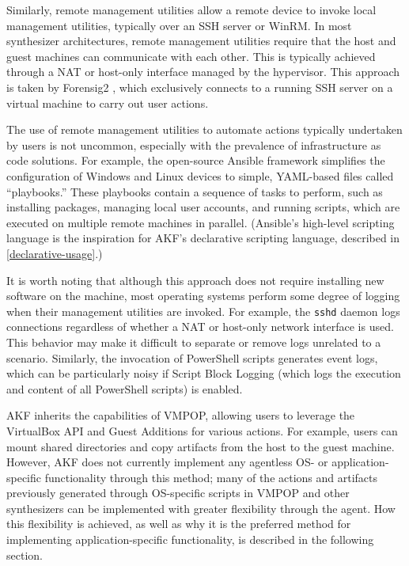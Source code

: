 \documentclass[letterpaper,12pt]{report}
\newcommand{\passthrough}[1]{#1}
\begin{document}
Similarly, remote management utilities allow a remote device to invoke
local management utilities, typically over an SSH server or WinRM. In
most synthesizer architectures, remote management utilities require that
the host and guest machines can communicate with each other. This is
typically achieved through a NAT or host-only interface managed by the
hypervisor. This approach is taken by Forensig2
\cite{mochForensicImageGenerator2009}, which exclusively connects to
a running SSH server on a virtual machine to carry out user actions.

The use of remote management utilities to automate actions typically
undertaken by users is not uncommon, especially with the prevalence of
infrastructure as code solutions. For example, the open-source Ansible
framework simplifies the configuration of Windows and Linux devices to
simple, YAML-based files called ``playbooks.'' These playbooks contain a
sequence of tasks to perform, such as installing packages, managing
local user accounts, and running scripts, which are executed on multiple
remote machines in parallel. (Ansible's high-level scripting language is
the inspiration for AKF's declarative scripting language, described in
\autoref{declarative-usage}.)

It is worth noting that although this approach does not require
installing new software on the machine, most operating systems perform
some degree of logging when their management utilities are invoked. For
example, the \passthrough{\lstinline!sshd!} daemon logs connections
regardless of whether a NAT or host-only network interface is used. This
behavior may make it difficult to separate or remove logs unrelated to a
scenario. Similarly, the invocation of PowerShell scripts generates
event logs, which can be particularly noisy if Script Block Logging
(which logs the execution and content of all PowerShell scripts) is
enabled.

AKF inherits the capabilities of VMPOP, allowing users to leverage the
VirtualBox API and Guest Additions for various actions. For example,
users can mount shared directories and copy artifacts from the host to
the guest machine. However, AKF does not currently implement any
agentless OS- or application-specific functionality through this method;
many of the actions and artifacts previously generated through
OS-specific scripts in VMPOP \cite{parkTREDEVMPOPCultivating2018}
and other synthesizers can be implemented with greater flexibility
through the agent. How this flexibility is achieved, as well as why it
is the preferred method for implementing application-specific
functionality, is described in the following section.
\end{document}

